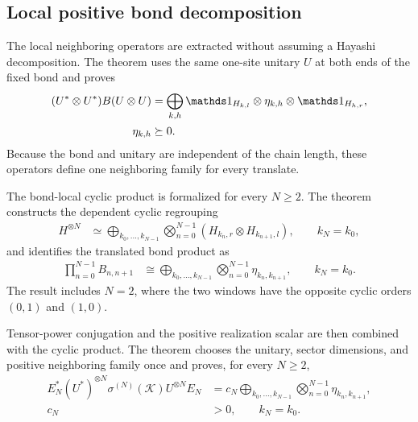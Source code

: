 \documentclass{article}
\begin{document}
\subsection{Local positive bond decomposition}

The local neighboring operators are extracted without assuming a Hayashi
decomposition. The theorem
uses the same one-site unitary $U$ at both ends of the fixed bond and proves
\begin{align}
    (U^*\otimes U^*)B(U\otimes U)
        &=
        \bigoplus_{k,h}
        \Id_{H_{k,l}}\otimes\eta_{k,h}\otimes\Id_{H_{h,r}},
    \label{eq:cpsv16_commuting_form_to_sal_positive_eta_bond_decomposition}\\
    \eta_{k,h}
        &\succeq0.
    \label{eq:cpsv16_commuting_form_to_sal_positive_eta_blocks}
\end{align}
Because the bond and unitary are independent of the chain length, these
operators define one neighboring family for every translate.

The bond-local cyclic product is formalized for every $N\geq2$. The theorem
constructs the dependent cyclic regrouping
\begin{align}
    H^{\otimes N}
        &\simeq
        \bigoplus_{k_0,\ldots,k_{N-1}}
        \bigotimes_{n=0}^{N-1}
        \left(H_{k_n,r}\otimes H_{k_{n+1},l}\right),
    \qquad k_N=k_0,
    \label{eq:cpsv16_commuting_form_to_sal_cyclic_hilbert_regrouping}
\end{align}
and identifies the translated bond product as
\begin{align}
    \prod_{n=0}^{N-1}B_{n,n+1}
        &\cong
        \bigoplus_{k_0,\ldots,k_{N-1}}
        \bigotimes_{n=0}^{N-1}\eta_{k_n,k_{n+1}},
    \qquad k_N=k_0.
    \label{eq:cpsv16_commuting_form_to_sal_cyclic_eta_product}
\end{align}
The result includes $N=2$, where the two windows have the opposite cyclic
orders $(0,1)$ and $(1,0)$.

Tensor-power conjugation and the positive realization scalar are then combined
with the cyclic product. The theorem
chooses the unitary, sector dimensions, and positive neighboring family once
and proves, for every $N\geq2$,
\begin{align}
    E_N^*(U^*)^{\otimes N}
        \sigma^{(N)}(\mathcal K)
        U^{\otimes N}E_N
        &=
        c_N
        \bigoplus_{k_0,\ldots,k_{N-1}}
        \bigotimes_{n=0}^{N-1}\eta_{k_n,k_{n+1}},
    \label{eq:cpsv16_commuting_form_to_sal_scaled_cyclic_eta_decomposition}\\
    c_N
        &>0,
    \qquad k_N=k_0.
    \label{eq:cpsv16_commuting_form_to_sal_scaled_cyclic_eta_conditions}
\end{align}
\end{document}
